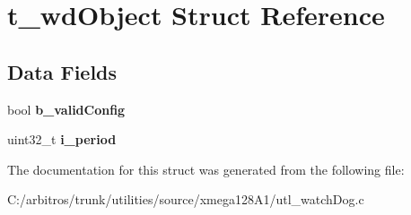 \hypertarget{structt__wd_object}{\section{t\-\_\-wd\-Object Struct Reference}
\label{structt__wd_object}
}
\subsection*{Data Fields}
\begin{DoxyCompactItemize}
\item 
\hypertarget{structt__wd_object_a73c33a12d6cfbcd5768be5bddef10c27}{bool {\bfseries b\-\_\-valid\-Config}}\label{structt__wd_object_a73c33a12d6cfbcd5768be5bddef10c27}

\item 
\hypertarget{structt__wd_object_add933ab8ce934f093e4cd736a7c8de43}{uint32\-\_\-t {\bfseries i\-\_\-period}}\label{structt__wd_object_add933ab8ce934f093e4cd736a7c8de43}

\end{DoxyCompactItemize}


The documentation for this struct was generated from the following file\-:\begin{DoxyCompactItemize}
\item 
C\-:/arbitros/trunk/utilities/source/xmega128\-A1/utl\-\_\-watch\-Dog.\-c\end{DoxyCompactItemize}
